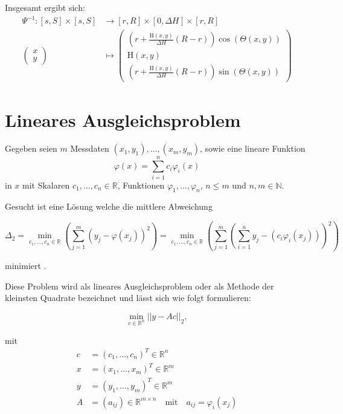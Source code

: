 Insgesamt ergibt sich:
\begin{equation}\label{eq:LateralToCone}
\begin{aligned}
\Psi^{-1} \colon  [s,S]\times[s,S] &\to [r,R] \times [0, \Delta H] \times [r,R]\\
\begin{pmatrix}
x \\ y
\end{pmatrix} &\mapsto
\begin{pmatrix}
\left( r + \frac{\mathrm{H}(x,y)}{\Delta H} (R - r)\right)\cos\left(\Theta(x,y) \right) \\
\mathrm{H}(x,y)\\
\left( r + \frac{\mathrm{H}(x,y)}{\Delta H} (R - r)\right)\sin\left(\Theta(x,y) \right)
\end{pmatrix}
\end{aligned}
\end{equation}


\section{Lineares Ausgleichsproblem}
\label{s:LSQ}
Gegeben seien $m$ Messdaten $(x_1,y_1),\dotsc,(x_m,y_m)$, sowie eine lineare Funktion
\[
\varphi(x) = \sum_{i = 1}^{n}c_i\varphi_i(x)
\] %
in $x$ mit Skalaren $c_1,\dotsc,c_n\in\mathbb{R}$, Funktionen $\varphi_1,\dotsc,\varphi_n$, $n\leq m$ und $n,m\in\mathbb{N}$.

Gesucht ist eine Lösung welche die mittlere Abweichung

\[
\Delta_2 = \min_{c_1,\dotsc,c_n\in\mathbb{R}} \left(\sum_{j=1}^{m}\left(y_j - \varphi(x_j)\right)^2\right) = \min_{c_1,\dotsc,c_n\in\mathbb{R}} \left(\sum_{j=1}^{m}\left(\sum_{i=1}^{n}y_j-\left(c_i\varphi_i(x_j)\right)\right)^2\right)
\]

minimiert \cite{Stoer2007}.

Diese Problem wird als lineares Ausgleichsproblem oder als Methode der kleinsten Quadrate bezeichnet und lässt sich wie folgt formulieren:

\[
\min_{c\in\mathbb{R}^n} ||y - Ac||_2,
\]

mit
\[
\begin{aligned}
c &= (c_1,\dotsc,c_n)^T\in\mathbb{R}^n \\
x &= (x_1,\dotsc,x_m)^T\in\mathbb{R}^m \\
y &= (y_1,\dotsc,y_m)^T\in\mathbb{R}^m \\
A &= (a_{ij})\in\mathbb{R}^{m\times n}\quad\text{mit}\quad a_{ij} = \varphi_i(x_j)
\end{aligned}
\]

